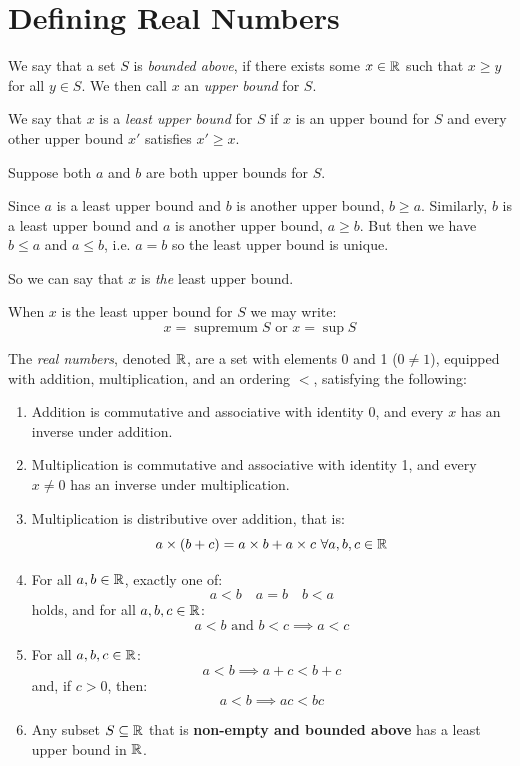 \documentclass[../main.tex]{subfiles}
\begin{document}
\section{Defining Real Numbers}
\begin{definition}
  We say that a set $S$ is \textit{bounded above}, if there exists some $x \in \mathbb{R}$ such that $x \geq y$ for all $y \in S$.
  We then call $x$ an \textit{upper bound} for $S$.
\end{definition}
\begin{definition}
  We say that $x$ is a \textit{least upper bound} for $S$ if $x$ is an upper bound for $S$ and every other upper bound $x'$ satisfies $x' \geq x$.
\end{definition}
\begin{remark}[Uniqueness]
  Suppose both $a$ and $b$ are both upper bounds for $S$.

  Since $a$ is a least upper bound and $b$ is another upper bound, $b \geq a$.
  Similarly, $b$ is a least upper bound and $a$ is another upper bound, $a \geq b$.
  But then we have $b \leq a$ and $a \leq b$, i.e. $a = b$ so the least upper bound is unique.

  So we can say that $x$ is \textit{the} least upper bound.
\end{remark}
\begin{remark}[Notation]
  When $x$ is the least upper bound for $S$ we may write:
  \[
    x = \operatorname{supremum} S \text{ or } x = \sup S
  \]
\end{remark}
\begin{definition}
  The \textit{real numbers}, denoted $\mathbb{R}$, are a set with elements 0 and 1 ($0 \neq 1$), equipped with addition, multiplication, and an ordering $<$, satisfying the following:
  \label{realDef}
  \begin{enumerate}
    \item Addition is commutative and associative with identity 0, and every $x$ has an inverse under addition.
    \item Multiplication is commutative and associative with identity 1, and every $x \neq 0$ has an inverse under multiplication.
    \item Multiplication is distributive over addition, that is:
      \[
        a \times (b + c) = a \times b + a \times c\ \forall a, b, c \in \R
      \]
    \item For all $a, b \in \mathbb{R}$, exactly one of:
      \[
        a < b \quad a = b \quad b < a
      \]
      holds, and for all $a, b, c \in \mathbb{R}$:
      \[
        a < b \text{ and } b < c \implies a < c
      \]
    \item For all $a, b, c \in \mathbb{R}$:
      \[
        a < b \implies a + c < b + c
      \]
      and, if $c > 0$, then:
      \[
        a < b \implies ac < bc
      \]
    \item Any subset $S \subseteq \mathbb{R}$ that is \textbf{non-empty and bounded above} has a least upper bound in $\mathbb{R}$.
  \end{enumerate}
\end{definition}
\end{document}
